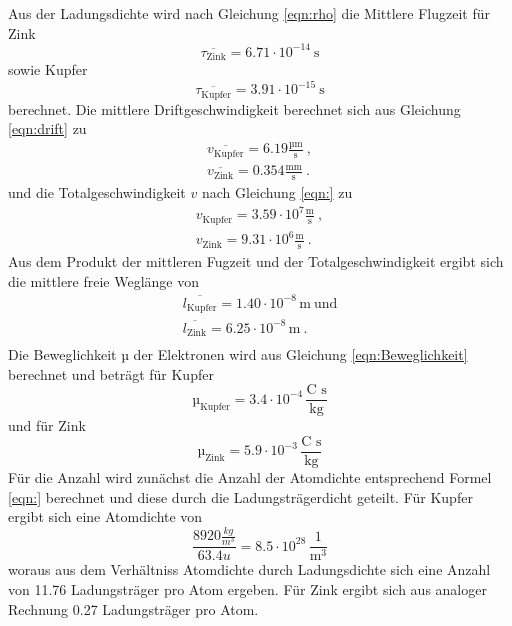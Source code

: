 Aus der Ladungsdichte wird nach Gleichung \ref{eqn:rho} die Mittlere Flugzeit für Zink
\begin{equation}
  \overline{\tau_\text{Zink}} = 6.71 \cdot 10^{-14} \ \text{s}
  \label{eqn:tZ}
\end{equation}
sowie Kupfer
\begin{equation}
  \overline{\tau_\text{Kupfer}} = 3.91 \cdot 10^{-15} \ \text{s}
    \label{eqn:tK}
\end{equation}
berechnet. Die mittlere Driftgeschwindigkeit berechnet sich aus Gleichung \ref{eqn:drift} zu
\begin{eqnarray}
  \overline{v_\text{Kupfer}} = 6.19 \frac{\text{µm}}{\text{s}} \ , \\
  \overline{v_\text{Zink}} = 0.354 \frac{\text{mm}}{\text{s}} \ .
\end{eqnarray}
und die Totalgeschwindigkeit $v$ nach Gleichung \ref{eqn:} zu
\begin{eqnarray}
  v_\text{Kupfer} = 3.59 \cdot 10^7 \frac{\text{m}}{\text{s}} \ , \\
  v_\text{Zink} = 9.31 \cdot 10^6 \frac{\text{m}}{\text{s}} \ .
\end{eqnarray}
Aus dem Produkt der mittleren Fugzeit und der Totalgeschwindigkeit ergibt sich die mittlere freie Weglänge von
\begin{eqnarray}
  \overline{l_\text{Kupfer}} = 1.40 \cdot 10^{-8} \, \text{m} \ \text{und} \\
  \overline{l_\text{Zink}} = 6.25 \cdot 10^{-8} \, \text{m} \ .\\
\end{eqnarray}
Die Beweglichkeit $µ$ der Elektronen wird aus Gleichung \ref{eqn:Beweglichkeit} berechnet und beträgt für Kupfer
\begin{equation}
  µ_\text{Kupfer} = 3.4 \cdot 10^{-4} \, \frac{\text{C s}}{\text{kg}}
\end{equation}
und für Zink
\begin{equation}
  µ_\text{Zink} = 5.9 \cdot 10^{-3} \, \frac{\text{C s}}{\text{kg}}
\end{equation}
Für die Anzahl wird zunächst die Anzahl der Atomdichte entsprechend Formel \ref{eqn:} berechnet und diese durch die Ladungsträgerdicht geteilt. Für Kupfer ergibt sich eine Atomdichte von
\begin{equation}
  \frac{8920 \frac{kg}{m^3}}{63.4 u} = 8.5 \cdot 10^{28} \, \frac{1}{\text{m}^3}
\end{equation}
woraus aus dem Verhältniss Atomdichte durch Ladungsdichte sich eine Anzahl von 11.76 Ladungsträger pro Atom ergeben. Für Zink ergibt sich aus analoger Rechnung 0.27 Ladungsträger pro Atom.
